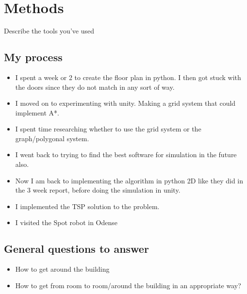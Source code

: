 \section*{Methods}
Describe the tools you’ve used

\subsection{My process}
\begin{itemize}
    \item I spent a week or 2 to create the floor plan in python. I then got stuck with the doors since they do not match in any sort of way.
    \item I moved on to experimenting with unity. Making a grid system that could implement A*.
    \item I spent time researching whether to use the grid system or the graph/polygonal system.
    \item I went back to trying to find the best software for simulation in the future also.
    \item Now I am back to implementing the algorithm in python 2D like they did in the 3 week report, before doing the simulation in unity.
    \item I implemented the TSP solution to the problem. 
    \item I visited the Spot robot in Odense
\end{itemize}


\subsection{General questions to answer}
\begin{itemize}
    \item How to get around the building
    \item How to get from room to room/around the building in an appropriate way?
\end{itemize}

